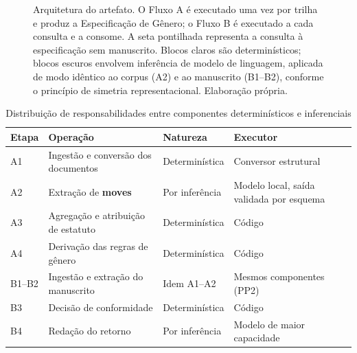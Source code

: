 \begin{figure}[H]
\caption{Arquitetura do artefato. O Fluxo A é executado uma vez por trilha e produz a
Especificação de Gênero; o Fluxo B é executado a cada consulta e a consome. A seta pontilhada
representa a consulta à especificação sem manuscrito. Blocos claros são determinísticos;
blocos escuros envolvem inferência de modelo de linguagem, aplicada de modo idêntico ao corpus
(A2) e ao manuscrito (B1--B2), conforme o princípio de simetria representacional. Elaboração própria.}
\label{fig:arquitetura}
\end{figure}

\begin{table}[H]
\centering
\caption{Distribuição de responsabilidades entre componentes determinísticos e inferenciais}
\label{tab:responsabilidades}
\small
\begin{tabular}{|p{1.6cm}|p{5.6cm}|p{2.6cm}|p{3.4cm}|}
\hline
\textbf{Etapa} & \textbf{Operação} & \textbf{Natureza} & \textbf{Executor} \\
\hline
A1 & Ingestão e conversão dos documentos & Determinística & Conversor estrutural \\
\hline
A2 & Extração de \textbf{moves} & Por inferência & Modelo local, saída validada por esquema \\
\hline
A3 & Agregação e atribuição de estatuto & Determinística & Código \\
\hline
A4 & Derivação das regras de gênero & Determinística & Código \\
\hline
B1--B2 & Ingestão e extração do manuscrito & Idem A1--A2 & Mesmos componentes (PP2) \\
\hline
B3 & Decisão de conformidade & Determinística & Código \\
\hline
B4 & Redação do retorno & Por inferência & Modelo de maior capacidade \\
\hline
\end{tabular}
\end{table}


